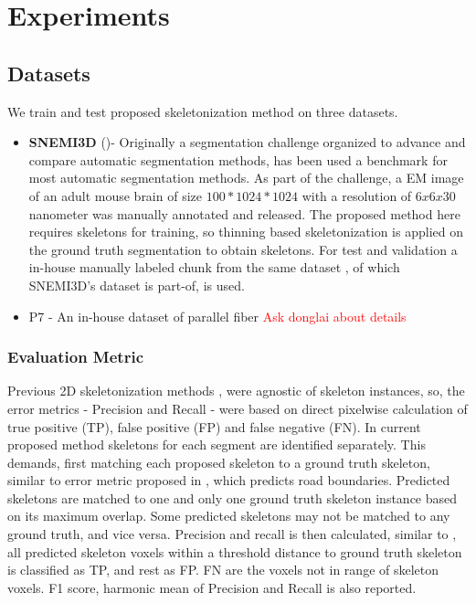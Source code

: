 
\chapter{Experiments}\label{chapter:experiments}

\section{Datasets}
We train and test proposed skeletonization method on three datasets.

\begin{itemize}
	\item \textbf{SNEMI3D} (\cite{SNEMI3D})- Originally a segmentation challenge organized to advance and compare automatic segmentation methods, has been used a benchmark for most automatic segmentation methods. As part of the challenge, a EM image of an adult mouse brain of size $100*1024*1024$ with a resolution of $6x6x30$ nanometer was manually annotated and released. The proposed method here requires skeletons for training, so thinning based skeletonization is applied on the ground truth segmentation to obtain skeletons. For test and validation a in-house manually labeled chunk from the same dataset \cite{Kasthuri2015}, of which SNEMI3D's dataset is part-of, is used.
	\item P7 - An in-house dataset of parallel fiber \textcolor{red}{Ask donglai about details}
\end{itemize}

\subsection{Evaluation Metric}
Previous 2D skeletonization methods \cite{Wang2019}, \cite{Xu2019} were agnostic of skeleton instances, so, the error metrics - Precision and Recall - were based on direct pixelwise calculation of true positive (TP), false positive (FP) and false negative (FN). 
In current proposed method skeletons for each segment are identified separately. This demands, first matching each proposed skeleton to a ground truth skeleton, similar to error metric proposed in \cite{Liang2019}, which predicts road boundaries. Predicted skeletons are matched to one and only one ground truth skeleton instance based on its maximum overlap. Some predicted skeletons may not be matched to any ground truth, and vice versa. Precision and recall is then calculated, similar to \cite{Liang2019}, all predicted skeleton voxels within a threshold distance to ground truth skeleton is classified as TP, and rest as FP. FN are the voxels not in range of skeleton voxels. F1 score, harmonic mean of Precision and Recall is also reported.

